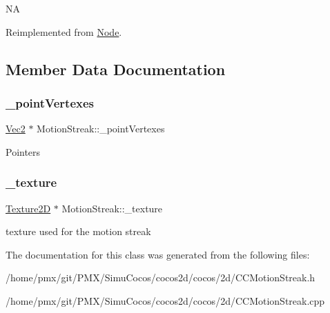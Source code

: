 NA 

Reimplemented from \hyperlink{classNode_a32878481ba54b3856ab53c10af13848e}{Node}.



\subsection{Member Data Documentation}
\mbox{\label{classMotionStreak_a8ff067fc94ea1c66ff07c60caf8fbd11}} 
\subsubsection{\texorpdfstring{\+\_\+point\+Vertexes}{\_pointVertexes}}
{\footnotesize\ttfamily \hyperlink{classVec2}{Vec2} $\ast$ Motion\+Streak\+::\+\_\+point\+Vertexes\hspace{0.3cm}{\ttfamily [protected]}}

Pointers \mbox{\label{classMotionStreak_af31940beff286ef05a3015d2b8c36b71}} 
\subsubsection{\texorpdfstring{\+\_\+texture}{\_texture}}
{\footnotesize\ttfamily \hyperlink{classTexture2D}{Texture2D} $\ast$ Motion\+Streak\+::\+\_\+texture\hspace{0.3cm}{\ttfamily [protected]}}

texture used for the motion streak 

The documentation for this class was generated from the following files\+:\begin{DoxyCompactItemize}
\item 
/home/pmx/git/\+P\+M\+X/\+Simu\+Cocos/cocos2d/cocos/2d/C\+C\+Motion\+Streak.\+h\item 
/home/pmx/git/\+P\+M\+X/\+Simu\+Cocos/cocos2d/cocos/2d/C\+C\+Motion\+Streak.\+cpp\end{DoxyCompactItemize}
